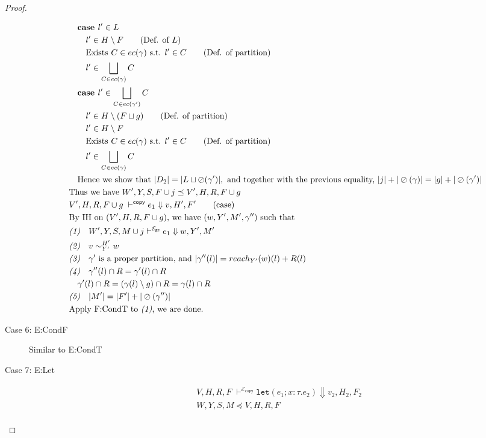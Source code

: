 \documentclass[11pt]{article}
\newcommand{\ms}[1]{\ensuremath{\mathsf{#1}}}
\newcommand{\irl}[1]{\mathtt{#1}}
\newcommand{\veq}[4]{#3 \sim^{#1}_{#2} #4}
\newcommand{\oh}[1]{\oslash(#1)}
\newcommand{\gcSem}{\ensuremath{\mathcal{E}_{\ms{gc}}}}
\newcommand{\copySem}{\ensuremath{\mathcal{E}_{\ms{copy}}}}
\theoremstyle{definition}
\begin{document}
\begin{proof}
\begin{description}
\begin{align*}
		&\quad\textbf{case } l' \in L\\
		&\quad\quad l' \in H \setminus F \tag{Def. of $L$}\\
		&\quad\quad \text{Exists } C \in ec(\gamma) \text{ s.t. } l' \in C \tag{Def. of partition}\\
		&\quad\quad l' \in \bigsqcup_{C \in ec(\gamma)} C\\
		&\quad\textbf{case } l' \in \bigsqcup_{C \in ec(\gamma')} C\\
		&\quad\quad l' \in H \setminus (F \sqcup g) \tag{Def. of partition}\\
		&\quad\quad l' \in H \setminus F \\
		&\quad\quad \text{Exists } C \in ec(\gamma) \text{ s.t. } l' \in C \tag{Def. of partition}\\
		&\quad\quad l' \in \bigsqcup_{C \in ec(\gamma)} C\\
		&\quad\text{Hence we show that } |D_2| = |L \sqcup \oh{\gamma'}|, \text{ and together with the previous 
		equality, } |j| + |\oh{\gamma}| = |g| + |\oh{\gamma'}|\\
		&\text{Thus we have } W',Y,S,F \cup j \preceq V',H,R,F \cup g\\
  	&V',H,R,F \cup g\; \vdash^{\mathsf{copy}} e_1 \Downarrow v, H',F' \tag{case}\\
		&\text{By IH on $(V',H,R,F\cup g)$, we have } (w,Y',M',\gamma'') \text{ such that }\\
		&\emph{(1)}\quad  W',Y,S,M \cup j  \vdash^{\gcSem} e_1 \Downarrow w,Y',M'\\
		&\emph{(2)}\quad \veq{H'}{Y'}{v}{w}\\
		&\emph{(3)}\quad \gamma' \text{ is a proper partition, and } |\gamma''(l)| = 
			reach_{Y'}(w)(l) + R(l)\\
		&\emph{(4)}\quad \gamma''(l) \cap R = \gamma'(l) \cap R \\
		&\quad \gamma'(l) \cap R = (\gamma(l) \setminus g) \cap R= \gamma(l) \cap R\\
		&\emph{(5)}\quad |M'| = |F'| + |\oh{\gamma''}|\\
		&\text{Apply F:CondT to \emph{(1)}, we are done.}
  \end{align*}
  \item[Case 6: E:CondF] 
  Similar to E:CondT
  \item[Case 7: E:Let]
  \begin{align*}
		&V,H,R,F \; \vdash^{\copySem} \irl{let}(e_1; x : \tau.e_2) \Downarrow v_2,H_2,F_2 \tag{case}\\
		&W,Y,S,M \preceq V,H,R,F \tag{assumption}\\

\end{align*}
\end{description}
\end{proof}
\end{document}
